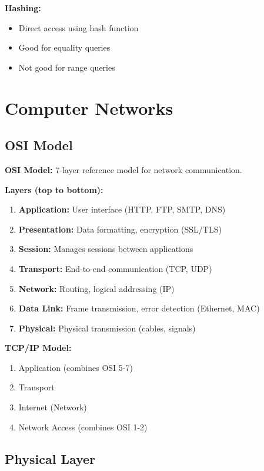 \documentclass[11pt,a4paper]{article}
\begin{document}
\textbf{Hashing:}
\begin{itemize}
    \item Direct access using hash function
    \item Good for equality queries
    \item Not good for range queries
\end{itemize}

\section{Computer Networks}

\subsection{OSI Model}

\begin{defbox}
\textbf{OSI Model:} 7-layer reference model for network communication.
\end{defbox}

\textbf{Layers (top to bottom):}
\begin{enumerate}
    \item \textbf{Application:} User interface (HTTP, FTP, SMTP, DNS)
    \item \textbf{Presentation:} Data formatting, encryption (SSL/TLS)
    \item \textbf{Session:} Manages sessions between applications
    \item \textbf{Transport:} End-to-end communication (TCP, UDP)
    \item \textbf{Network:} Routing, logical addressing (IP)
    \item \textbf{Data Link:} Frame transmission, error detection (Ethernet, MAC)
    \item \textbf{Physical:} Physical transmission (cables, signals)
\end{enumerate}

\textbf{TCP/IP Model:}
\begin{enumerate}
    \item Application (combines OSI 5-7)
    \item Transport
    \item Internet (Network)
    \item Network Access (combines OSI 1-2)
\end{enumerate}

\subsection{Physical Layer}
\end{document}
